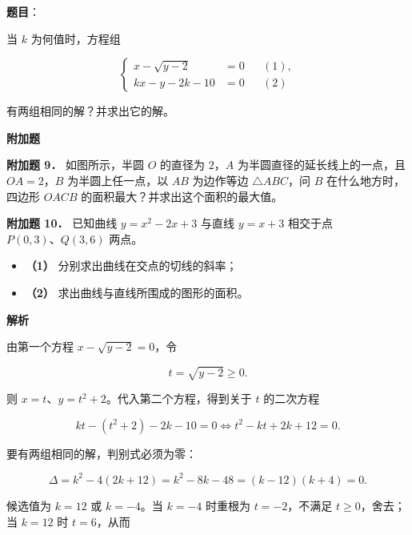 \begin{answer}

\textbf{题目}：

当 $k$ 为何值时，方程组

\nopagebreak[4]
\[
\left\{
\begin{aligned}
x-\sqrt{y-2}&=0 &&(1),\\
kx-y-2k-10&=0 &&(2)
\end{aligned}
\right.
\]

有两组相同的解？并求出它的解。

\begin{gktip}
\Needspace{0.25\textheight}
\textbf{附加题}
\end{gktip}

\textbf{附加题 9．} 如图所示，半圆 $O$ 的直径为 $2$，$A$ 为半圆直径的延长线上的一点，且 $OA=2$，$B$ 为半圆上任一点，以 $AB$ 为边作等边 $\triangle ABC$，问 $B$ 在什么地方时，四边形 $OACB$ 的面积最大？并求出这个面积的最大值。
\nopagebreak[4]
\begin{center}\end{center}
\nopagebreak[4]
\textbf{附加题 10．} 已知曲线 $y=x^2-2x+3$ 与直线 $y=x+3$ 相交于点 $P(0,3)\text{、}Q(3,6)$ 两点。

\begin{itemize}
\item \textbf{（1）} 分别求出曲线在交点的切线的斜率；
\end{itemize}

\begin{itemize}
\item \textbf{（2）} 求出曲线与直线所围成的图形的面积。
\end{itemize}

\textbf{解析}

由第一个方程 $x-\sqrt{y-2}=0$，令

\nopagebreak[4]
\[
t=\sqrt{y-2}\geqslant0.
\]

则 $x=t$、$y=t^2+2$。代入第二个方程，得到关于 $t$ 的二次方程

\nopagebreak[4]
\[
kt-(t^2+2)-2k-10=0
\Longleftrightarrow
t^2-kt+2k+12=0.
\]

要有两组相同的解，判别式必须为零：

\nopagebreak[4]
\[
\Delta=k^2-4(2k+12)=k^2-8k-48=(k-12)(k+4)=0.
\]

候选值为 $k=12$ 或 $k=-4$。当 $k=-4$ 时重根为 $t=-2$，不满足 $t\geqslant0$，舍去；当 $k=12$ 时 $t=6$，从而


\end{answer}
